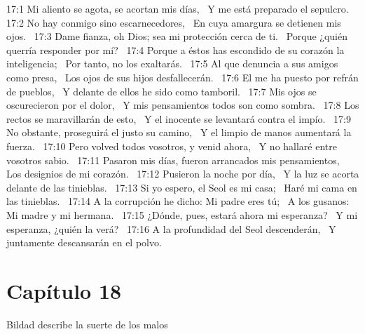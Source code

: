 17:1 Mi aliento se agota, se acortan mis días,  
Y me está preparado el sepulcro.  
17:2 No hay conmigo sino escarnecedores,  
En cuya amargura se detienen mis ojos.  
17:3 Dame fianza, oh Dios; sea mi protección cerca de ti.  
Porque ¿quién querría responder por mí?  
17:4 Porque a éstos has escondido de su corazón la inteligencia;  
Por tanto, no los exaltarás.  
17:5 Al que denuncia a sus amigos como presa,  
Los ojos de sus hijos desfallecerán.  
17:6 El me ha puesto por refrán de pueblos,  
Y delante de ellos he sido como tamboril.  
17:7 Mis ojos se oscurecieron por el dolor,  
Y mis pensamientos todos son como sombra.  
17:8 Los rectos se maravillarán de esto,  
Y el inocente se levantará contra el impío.  
17:9 No obstante, proseguirá el justo su camino,  
Y el limpio de manos aumentará la fuerza.  
17:10 Pero volved todos vosotros, y venid ahora,  
Y no hallaré entre vosotros sabio.  
17:11 Pasaron mis días, fueron arrancados mis pensamientos,  
Los designios de mi corazón.  
17:12 Pusieron la noche por día,  
Y la luz se acorta delante de las tinieblas.  
17:13 Si yo espero, el Seol es mi casa;  
Haré mi cama en las tinieblas.  
17:14 A la corrupción he dicho: Mi padre eres tú;  
A los gusanos: Mi madre y mi hermana.  
17:15 ¿Dónde, pues, estará ahora mi esperanza?  
Y mi esperanza, ¿quién la verá?  
17:16 A la profundidad del Seol descenderán,  
Y juntamente descansarán en el polvo. 
\section*{Capítulo 18 }
Bildad describe la suerte de los malos  

